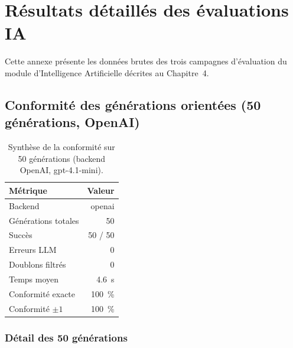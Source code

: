\chapter{R\'esultats d\'etaill\'es des \'evaluations IA}
\renewcommand{\thepage}{\thechapter-\arabic{page}}

Cette annexe pr\'esente les donn\'ees brutes des trois campagnes d'\'evaluation du module d'Intelligence Artificielle d\'ecrites au Chapitre~4.


\section{Conformit\'e des g\'en\'erations orient\'ees (50 g\'en\'erations, OpenAI)}

\begin{table}[!htbp]
\centering
\begin{tabular}{l r}
\toprule
\textbf{M\'etrique} & \textbf{Valeur} \\
\midrule
Backend & openai \\
G\'en\'erations totales & 50 \\
Succ\`es & 50 / 50 \\
Erreurs LLM & 0 \\
Doublons filtr\'es & 0 \\
Temps moyen & 4.6~s \\
Conformit\'e exacte & 100~\% \\
Conformit\'e $\pm 1$ & 100~\% \\
\bottomrule
\end{tabular}
\caption{Synth\`ese de la conformit\'e sur 50 g\'en\'erations (backend OpenAI, gpt-4.1-mini).}
\end{table}


\subsection{D\'etail des 50 g\'en\'erations}

